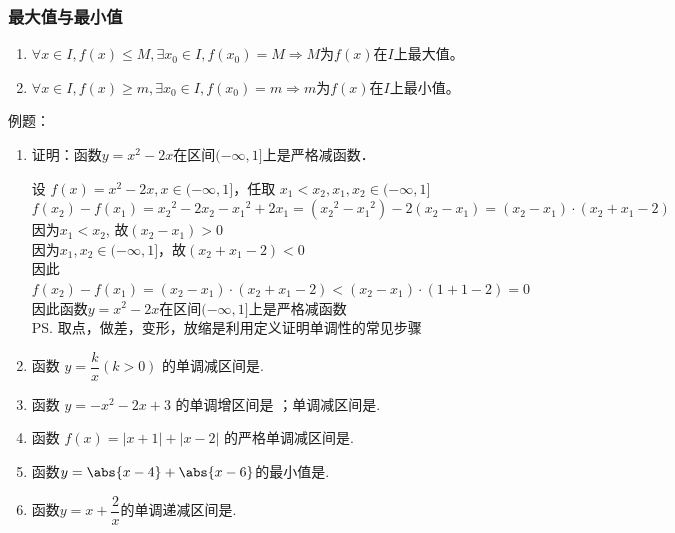 \subsubsection*{最大值与最小值}
\begin{enumerate}
    \item $\forall x \in I, f(x) \leq M, \exists x_0 \in I, f(x_0) = M \Rightarrow M \mbox{为} f(x)\mbox{在}I\mbox{上最大值}$。
    \item $\forall x \in I, f(x) \geq m, \exists x_0 \in I, f(x_0) = m \Rightarrow m \mbox{为} f(x)\mbox{在}I\mbox{上最小值}$。
\end{enumerate}

例题：
\begin{enumerate}
    \item 证明：函数$y = x^2 - 2x$在区间$(-\infty, 1]$上是严格减函数．
    \begin{jieda}
        设 $f(x) = x^2 - 2x, x \in (-\infty, 1]$，任取 $x_1 < x_2, x_1, x_2 \in (-\infty, 1]$ \\
        $f(x_2) - f(x_1) = {x_2}^2 - 2{x_2} - {x_1}^2 + 2{x_1} = ({x_2}^2 - {x_1}^2) - 2(x_2 - x_1) = (x_2 - x_1) \cdot (x_2 + x_1 - 2)$ \\
        因为$x_1 < x_2$, 故$(x_2 - x_1) > 0$ \\
        因为$x_1, x_2 \in (-\infty, 1]$，故$(x_2 + x_1 - 2) < 0$ \\
        因此$f(x_2) - f(x_1) = (x_2 - x_1) \cdot (x_2 + x_1 - 2) < (x_2 - x_1) \cdot (1 + 1 - 2) = 0$ \\
        因此函数$y = x^2 - 2x$在区间$(-\infty, 1]$上是严格减函数\\
        \ps 取点，做差，变形，放缩是利用定义证明单调性的常见步骤
    \end{jieda}
    \item 函数 $y=\dfrac{k}{x}(k>0)$ 的单调减区间是.

    \item 函数 $y=-x^2-2 x+3$ 的单调增区间是 ；单调减区间是.
    
    \item 函数 $f(x)=|x+1|+|x-2|$ 的严格单调减区间是.

    \item 函数$y=\abs{x-4}+\abs{x-6}$的最小值是. 
    
    \item 函数$y=x+\dfrac{2}{x}$的单调递减区间是. 


\end{enumerate}
